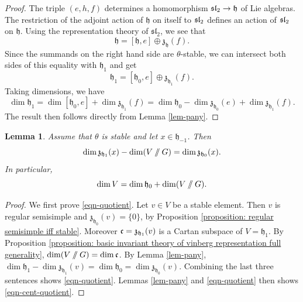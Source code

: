 \documentclass{article} %
\newtheorem{lemma}[proposition]{Lemma}
\numberwithin{equation}{section}
\theoremstyle{definition}
\newcommand{\GIT}{\mathbin{/\mkern-6mu/}}
\newcommand{\frakh}{\mathfrak h}
\newcommand{\frakz}{\mathfrak z}
\newcommand{\fraksl}{\mathfrak{sl}}
\begin{document}
\begin{proof}
The triple $(e,h,f)$ determines a homomorphism $\frak{sl}_2\rightarrow \frakh$ of Lie algebras.
The restriction of the adjoint action of $\frakh$ on itself to $\frak{sl}_2$ defines an action of $\frak{sl}_2$ on $\frakh$.
Using the representation theory of $\fraksl_2$, we see that 
\begin{equation*}
\frakh = [\frakh, e] \oplus \frakz_{\frakh}(f).
\end{equation*}
Since the summands on the right hand side are $\theta$-stable, we can intersect both sides of this equality with $\frakh_1$ and get
\begin{equation*}
\frakh_1 = [\frakh_0, e] \oplus \frakz_{\frakh_1}(f).
\end{equation*}
Taking dimensions, we have
\begin{equation*}
\dim \frakh_1 = \dim [\frakh_0,e] + \dim\frakz_{\frakh_1}(f) =  \dim \frakh_0 - \dim \frakz_{\frakh_0}(e) + \dim \frakz_{\frakh_1}(f). 
\end{equation*}
The result then follows directly from Lemma \ref{lem-pany}.
\end{proof}



\begin{lemma}\label{lemma: dim centralizers vs GIT quotient}
    Assume that $\theta$ is stable and let $x\in \frakh_{-1}$.
    Then 
    \begin{equation}\label{eqn-cent-quotient}
    \dim \frakz_{\frakh_1}(x) - \dim (V\GIT G) = \dim \frakz_{\frakh_0}(x).
\end{equation}
    In particular, 
    \begin{equation}\label{eqn-quotient}
    \dim V = \dim\frakh_0 + \dim (V\GIT G).
\end{equation}
\end{lemma}
\begin{proof}
   We first prove \eqref{eqn-quotient}.
    Let $v\in V$ be a stable element.
    Then $v$ is regular semisimple and $\frakz_{\frakh_0}(v)=\{0\}$, by Proposition \ref{proposition: regular semisimple iff stable}.
    Moreover $\frak{c} = \frakz_{\frakh_1}(v)$ is a Cartan subspace of $V = \frakh_1$.
    By Proposition \ref{proposition: basic invariant theory of vinberg representation full generality}, $\dim(V\GIT G) = \dim \frak{c}$.
    By Lemma \ref{lem-pany}, $\dim \frakh_1 - \dim \frakz_{\frakh_1}(v) = \dim \frakh_0 = \dim \frakz_{\frakh_0}(v)$.
    Combining the last three sentences shows \eqref{eqn-quotient}.
    Lemmas \ref{lem-pany} and \eqref{eqn-quotient} then shows \eqref{eqn-cent-quotient}.
\end{proof}
\end{document}
